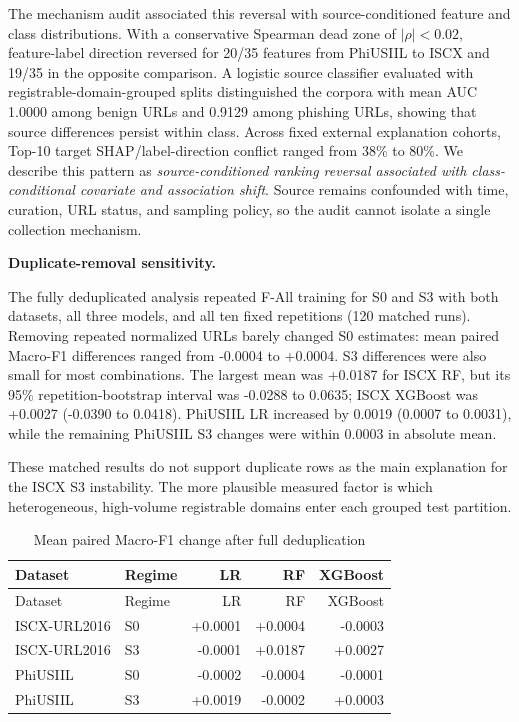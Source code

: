 \documentclass[
  10pt,
]{article}
\begin{document}
The mechanism audit associated this reversal with source-conditioned
feature and class distributions. With a conservative Spearman dead zone
of \(|\rho|<0.02\), feature-label direction reversed for 20/35 features
from PhiUSIIL to ISCX and 19/35 in the opposite comparison. A logistic
source classifier evaluated with registrable-domain-grouped splits
distinguished the corpora with mean AUC 1.0000 among benign URLs and
0.9129 among phishing URLs, showing that source differences persist
within class. Across fixed external explanation cohorts, Top-10 target
SHAP/label-direction conflict ranged from 38\% to 80\%. We describe this
pattern as \emph{source-conditioned ranking reversal associated with
class-conditional covariate and association shift}. Source remains
confounded with time, curation, URL status, and sampling policy, so the
audit cannot isolate a single collection mechanism.

\textbf{Duplicate-removal sensitivity.}

The fully deduplicated analysis repeated F-All training for S0 and S3
with both datasets, all three models, and all ten fixed repetitions (120
matched runs). Removing repeated normalized URLs barely changed S0
estimates: mean paired Macro-F1 differences ranged from -0.0004 to
+0.0004. S3 differences were also small for most combinations. The
largest mean was +0.0187 for ISCX RF, but its 95\% repetition-bootstrap
interval was -0.0288 to 0.0635; ISCX XGBoost was +0.0027 (-0.0390 to
0.0418). PhiUSIIL LR increased by 0.0019 (0.0007 to 0.0031), while the
remaining PhiUSIIL S3 changes were within 0.0003 in absolute mean.

These matched results do not support duplicate rows as the main
explanation for the ISCX S3 instability. The more plausible measured
factor is which heterogeneous, high-volume registrable domains enter
each grouped test partition.

\begin{longtable}[]{@{}llrrr@{}}
\caption{Mean paired Macro-F1 change after full
deduplication}\tabularnewline
\toprule\noalign{}
Dataset & Regime & LR & RF & XGBoost \\
\midrule\noalign{}
\endfirsthead
\toprule\noalign{}
Dataset & Regime & LR & RF & XGBoost \\
\midrule\noalign{}
\endhead
\bottomrule\noalign{}
\endlastfoot
ISCX-URL2016 & S0 & +0.0001 & +0.0004 & -0.0003 \\
ISCX-URL2016 & S3 & -0.0001 & +0.0187 & +0.0027 \\
PhiUSIIL & S0 & -0.0002 & -0.0004 & -0.0001 \\
PhiUSIIL & S3 & +0.0019 & -0.0002 & +0.0003 \\
\end{longtable}
\end{document}
